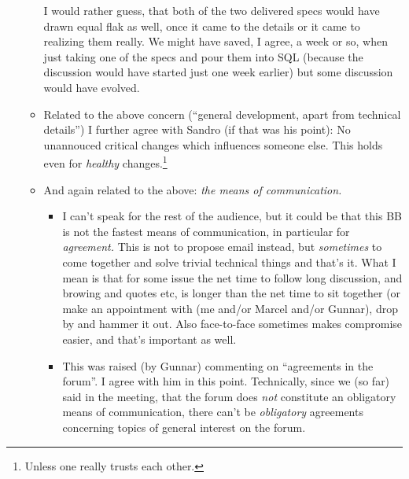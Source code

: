 \begin{itemize}
\begin{itemize}
    I would rather guess, that both of the two delivered specs would have
    drawn equal flak as well, once it came to the details or it came to
    realizing them really. We might have saved, I agree, a week or so, when
    just taking one of the specs and pour them into SQL (because the
    discussion would have started just one week earlier) but some discussion
    would have evolved. 
  \item Related to the above concern (``general development, apart from
    technical details'') I further agree with Sandro (if that was his point):
    No unannouced critical changes which influences someone else. This holds
    even for \emph{healthy} changes.\footnote{Unless one really trusts each
      other.} 
  \item And again related to the above: \emph{the means of communication.} 
    \begin{itemize}
    \item I can't speak for the rest of the audience, but it could be that
      this BB is not the fastest means of communication, in particular for
      \emph{agreement.} This is not to propose email instead, but
      \emph{sometimes} to come together and solve trivial technical things and
      that's it. What I mean is that for some issue the net time to follow
      long discussion, and browing and quotes etc, is longer than the net time
      to sit together (or make an appointment with (me and/or Marcel and/or
      Gunnar), drop by and hammer it out. Also face-to-face sometimes makes
      compromise easier, and that's important as well.
    \item This was raised (by Gunnar) commenting on ``agreements in the
      forum''. I agree with him in this point. Technically, since we (so far)
      said in the meeting, that the forum does \emph{not} constitute an
      obligatory means of communication, there can't be \emph{obligatory}
      agreements concerning topics of general interest on the forum.
      

\end{itemize}
\end{itemize}
\end{itemize}
